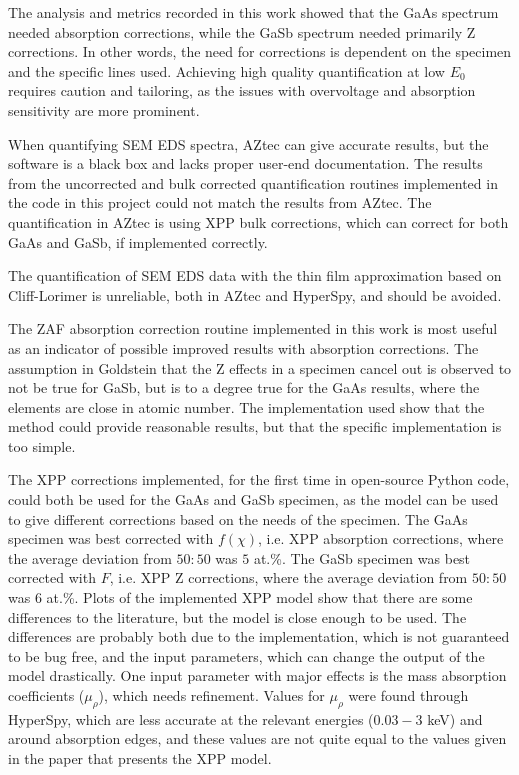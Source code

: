 The analysis and metrics recorded in this work showed that the GaAs spectrum needed absorption corrections, while the GaSb spectrum needed primarily Z corrections.
In other words, the need for corrections is dependent on the specimen and the specific lines used.
Achieving high quality quantification at low $E_0$ requires caution and tailoring, as the issues with overvoltage and absorption sensitivity are more prominent.

When quantifying SEM EDS spectra, AZtec can give accurate results, but the software is a black box and lacks proper user-end documentation.
The results from the uncorrected and bulk corrected quantification routines implemented in the code in this project could not match the results from AZtec.
The quantification in AZtec is using XPP bulk corrections, which can correct for both GaAs and GaSb, if implemented correctly.

The quantification of SEM EDS data with the thin film approximation based on Cliff-Lorimer is unreliable, both in AZtec and HyperSpy, and should be avoided.

The ZAF absorption correction routine implemented in this work is most useful as an indicator of possible improved results with absorption corrections.
The assumption in Goldstein \cite{goldstein_scanning_2018} that the Z effects in a specimen cancel out is observed to not be true for GaSb, but is to a degree true for the GaAs results, where the elements are close in atomic number.
The implementation used show that the method could provide reasonable results, but that the specific implementation is too simple.

The XPP corrections implemented, for the first time in open-source Python code, could both be used for the GaAs and GaSb specimen, as the model can be used to give different corrections based on the needs of the specimen.
The GaAs specimen was best corrected with $f(\chi)$, i.e. XPP absorption corrections, where the average deviation from $50:50$ was $5$ at.\%.
The GaSb specimen was best corrected with $F$, i.e. XPP Z corrections, where the average deviation from $50:50$ was $6$ at.\%.
Plots of the implemented XPP model show that there are some differences to the literature, but the model is close enough to be used.
The differences are probably both due to the implementation, which is not guaranteed to be bug free, and the input parameters, which can change the output of the model drastically.
One input parameter with major effects is the mass absorption coefficients ($\mu_\rho$), which needs refinement.
Values for $\mu_\rho$ were found through HyperSpy, which are less accurate at the relevant energies ($0.03-3$ keV) and around absorption edges, and these values are not quite equal to the values given in the paper that presents the XPP model.



